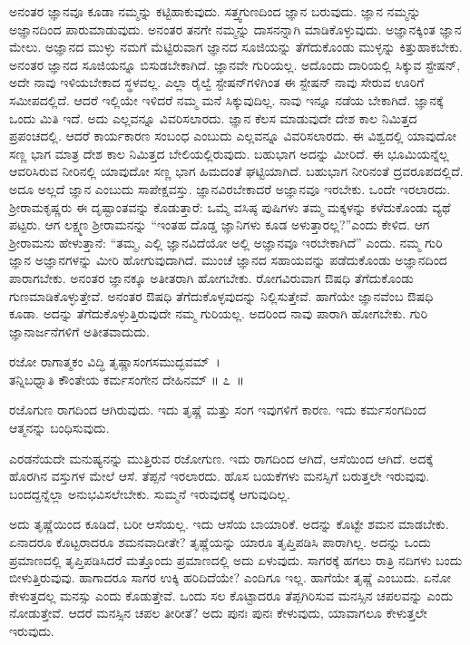 ಅನಂತರ ಜ್ಞಾನವೂ ಕೂಡಾ ನಮ್ಮನ್ನು ಕಟ್ಟಿಹಾಕುವುದು. ಸತ್ತ್ವಗುಣದಿಂದ ಜ್ಞಾನ ಬರುವುದು. ಜ್ಞಾನ ನಮ್ಮನ್ನು ಅಜ್ಞಾನದಿಂದ ಪಾರುಮಾಡುವುದು. ಅನಂತರ ತನಗೇ ನಮ್ಮನ್ನು ದಾಸನನ್ನಾಗಿ ಮಾಡಿಕೊಳ್ಳುವುದು. ಅಜ್ಞಾನಕ್ಕಿಂತ ಜ್ಞಾನ ಮೇಲು. ಅಜ್ಞಾನದ ಮುಳ್ಳು ನಮಗೆ ಮೆಟ್ಟಿರುವಾಗ ಜ್ಞಾನದ ಸೂಜಿಯನ್ನು ತೆಗೆದುಕೊಂಡು ಮುಳ್ಳನ್ನು ಕಿತ್ತುಹಾಕಬೇಕು. ಅನಂತರ ಜ್ಞಾನದ ಸೂಜಿಯನ್ನೂ ಬಿಸುಡಬೇಕಾಗಿದೆ. ಜ್ಞಾನವೇ ಗುರಿಯಲ್ಲ. ಅದೊಂದು ದಾರಿಯಲ್ಲಿ ಸಿಕ್ಕುವ ಸ್ಟೇಷನ್, ಅದೇ ನಾವು ಇಳಿಯಬೇಕಾದ ಸ್ಥಳವಲ್ಲ. ಎಲ್ಲಾ ರೈಲ್ವೆ ಸ್ಟೇಷನ್​ಗಳಿಗಿಂತ ಈ ಸ್ಟೇಷನ್ ನಾವು ಸೇರುವ ಊರಿಗೆ ಸಮೀಪದಲ್ಲಿದೆ. ಆದರೆ ಇಲ್ಲಿಯೇ ಇಳಿದರೆ ನಮ್ಮ ಮನೆ ಸಿಕ್ಕುವುದಿಲ್ಲ. ನಾವು ಇನ್ನೂ ನಡೆಯ ಬೇಕಾಗಿದೆ. ಜ್ಞಾನಕ್ಕೆ ಒಂದು ಮಿತಿ ಇದೆ. ಅದು ಎಲ್ಲವನ್ನೂ ವಿವರಿಸಲಾರದು. ಜ್ಞಾನ ಕೆಲಸ ಮಾಡುವುದೇ ದೇಶ ಕಾಲ ನಿಮಿತ್ತದ ಪ್ರಪಂಚದಲ್ಲಿ. ಆದರೆ ಕಾರ್ಯಕಾರಣ ಸಂಬಂಧ ಎಂಬುದು ಎಲ್ಲವನ್ನೂ ವಿವರಿಸಲಾರದು. ಈ ವಿಶ್ವದಲ್ಲಿ ಯಾವುದೋ ಸಣ್ಣ ಭಾಗ ಮಾತ್ರ ದೇಶ ಕಾಲ ನಿಮಿತ್ತದ ಬೇಲಿಯಲ್ಲಿರುವುದು. ಬಹುಭಾಗ ಅದನ್ನು ಮೀರಿದೆ. ಈ ಭೂಮಿಯನ್ನೆಲ್ಲ ಆವರಿಸಿರುವ ನೀರಿನಲ್ಲಿ ಯಾವುದೋ ಸಣ್ಣ ಭಾಗ ಹಿಮದಂತೆ ಘಟ್ಟಿಯಾಗಿದೆ. ಬಹುಭಾಗ ನೀರಿನಂತೆ ದ್ರವರೂಪದಲ್ಲಿದೆ. ಅದೂ ಅಲ್ಲದೆ ಜ್ಞಾನ ಎಂಬುದು ಸಾಪೇಕ್ಷವಸ್ತು. ಜ್ಞಾನವಿರಬೇಕಾದರೆ ಅಜ್ಞಾನವೂ ಇರಬೇಕು. ಒಂದೇ ಇರಲಾರದು. ಶ‍್ರೀರಾಮಕೃಷ್ಣರು ಈ ದೃಷ್ಟಾಂತವನ್ನು ಕೊಡುತ್ತಾರೆ: ಒಮ್ಮೆ ವಸಿಷ್ಠ ಪುಷಿಗಳು ತಮ್ಮ ಮಕ್ಕಳನ್ನು ಕಳೆದುಕೊಂಡು ವ್ಯಥೆ ಪಟ್ಟರು. ಆಗ ಲಕ್ಷ್ಮಣ ಶ‍್ರೀರಾಮನನ್ನು “ಇಂತಹ ದೊಡ್ಡ ಜ್ಞಾನಿಗಳು ಕೂಡ ಅಳುತ್ತಾರಲ್ಲ?”ಎಂದು ಕೇಳಿದ. ಆಗ ಶ‍್ರೀರಾಮನು ಹೇಳುತ್ತಾನೆ: “ತಮ್ಮ, ಎಲ್ಲಿ ಜ್ಞಾನವಿದೆಯೋ ಅಲ್ಲಿ ಅಜ್ಞಾನವೂ ಇರಬೇಕಾಗಿದೆ” ಎಂದು. ನಮ್ಮ ಗುರಿ ಜ್ಞಾನ ಅಜ್ಞಾನಗಳನ್ನು ಮೀರಿ ಹೋಗುವುದಾಗಿದೆ. ಮುಂಚೆ ಜ್ಞಾನದ ಸಹಾಯವನ್ನು ಪಡೆದುಕೊಂಡು ಅಜ್ಞಾನದಿಂದ ಪಾರಾಗಬೇಕು. ಅನಂತರ ಜ್ಞಾನಕ್ಕೂ ಅತೀತರಾಗಿ ಹೋಗಬೇಕು. ರೋಗವಿರುವಾಗ ಔಷಧಿ ತೆಗೆದುಕೊಂಡು ಗುಣಮಾಡಿಕೊಳ್ಳುತ್ತೇವೆ. ಅನಂತರ ಔಷಧಿ ತೆಗೆದುಕೊಳ್ಳವುದನ್ನು ನಿಲ್ಲಿಸುತ್ತೇವೆ. ಹಾಗೆಯೇ ಜ್ಞಾನವೆಂಬ ಔಷಧಿ ಕೂಡಾ. ಅದನ್ನು ತೆಗೆದುಕೊಳ್ಳುತ್ತಿರುವುದೇ ನಮ್ಮ ಗುರಿಯಲ್ಲ. ಅದರಿಂದ ನಾವು ಪಾರಾಗಿ ಹೋಗಬೇಕು. ಗುರಿ ಜ್ಞಾನಾರ್ಜನೆಗಳಿಗೆ ಅತೀತವಾದುದು.

\begin{shloka}
ರಜೋ ರಾಗಾತ್ಮಕಂ ವಿದ್ಧಿ ತೃಷ್ಣಾಸಂಗಸಮುದ್ಭವಮ್~।\\ತನ್ನಿಬಧ್ನಾತಿ ಕೌಂತೇಯ ಕರ್ಮಸಂಗೇನ ದೇಹಿನಮ್ \hfill॥ ೭~॥
\end{shloka}

\begin{artha}
ರಜೊಗುಣ ರಾಗದಿಂದ ಆಗಿರುವುದು. ಇದು ತೃಷ್ಣೆ ಮತ್ತು ಸಂಗ ಇವುಗಳಿಗೆ ಕಾರಣ. ಇದು ಕರ್ಮಸಂಗದಿಂದ ಆತ್ಮನನ್ನು ಬಂಧಿಸುವುದು.
\end{artha}

ಎರಡನೆಯದೇ ಮನುಷ್ಯನನ್ನು ಮುತ್ತಿರುವ ರಜೋಗುಣ. ಇದು ರಾಗದಿಂದ ಆಗಿದೆ, ಆಸೆಯಿಂದ ಆಗಿದೆ. ಅದಕ್ಕೆ ಹೊರಗಿನ ವಸ್ತುಗಳ ಮೇಲೆ ಆಸೆ. ತೆಪ್ಪನೆ ಇರಲಾರದು. ಹೊಸ ಬಯಕೆಗಳು ಮನಸ್ಸಿಗೆ ಬರುತ್ತಲೇ ಇರುವುವು. ಬಂದದ್ದನ್ನೆಲ್ಲಾ ಅನುಭವಿಸಲೇಬೇಕು. ಸುಮ್ಮನೆ ಇರುವುದಕ್ಕೆ ಆಗುವುದಿಲ್ಲ.

ಅದು ತೃಷ್ಣೆಯಿಂದ ಕೂಡಿದೆ, ಬರೀ ಆಸೆಯಲ್ಲ. ಇದು ಆಸೆಯ ಬಾಯಾರಿಕೆ. ಅದನ್ನು ಕೊಟ್ಟೇ ಶಮನ ಮಾಡಬೇಕು. ಏನಾದರೂ ಕೊಟ್ಟರಾದರೂ ಶಮನವಾದೀತೇ? ತೃಷ್ಣೆಯನ್ನು ಯಾರೂ ತೃಪ್ತಿಪಡಿಸಿ ಪಾರಾಗಿಲ್ಲ. ಅದನ್ನು ಒಂದು ಪ್ರಮಾಣದಲ್ಲಿ ತೃಪ್ತಿಪಡಿಸಿದರೆ ಮತ್ತೊಂದು ಪ್ರಮಾಣದಲ್ಲಿ ಅದು ಏಳುವುದು. ಸಾಗರಕ್ಕೆ ಹಗಲು ರಾತ್ರಿ ನದಿಗಳು ಬಂದು ಬೀಳುತ್ತಿರುವುವು. ಹಾಗಾದರೂ ಸಾಗರ ಉಕ್ಕಿ ಹರಿದಿದೆಯೇ? ಎಂದಿಗೂ ಇಲ್ಲ. ಹಾಗೆಯೇ ತೃಷ್ಣೆ ಎಂಬುದು. ಏನೋ ಕೇಳುತ್ತದಲ್ಲ ಮನಸ್ಸು ಎಂದು ಕೊಡುತ್ತೇವೆ. ಒಂದು ಸಲ ಕೊಟ್ಟಾದರೂ ತೆಪ್ಪಗಿರಿಸುವ ಮನಸ್ಸಿನ ಚಪಲವನ್ನು ಎಂದು ನೋಡುತ್ತೇವೆ. ಆದರೆ ಮನಸ್ಸಿನ ಚಪಲ ತೀರೀತೆ? ಅದು ಪುನಃ ಪುನಃ ಕೇಳುವುದು, ಯಾವಾಗಲೂ ಕೇಳುತ್ತಲೇ ಇರುವುದು.

